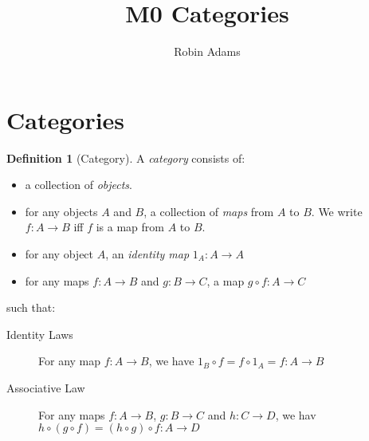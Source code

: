 \documentclass{article}
\title{M0 Categories}
\author{Robin Adams}
\theoremstyle{definition}
\newtheorem{definition}[axiom]{Definition}
\begin{document}
\maketitle
\tableofcontents

\section{Categories}

\begin{definition}[Category]
    A \emph{category} consists of:
    \begin{itemize}
        \item a collection of \emph{objects}.
        \item for any objects $A$ and $B$, a collection of \emph{maps} from $A$ to $B$. We write $f : A \rightarrow B$
        iff $f$ is a map from $A$ to $B$.
        \item for any object $A$, an \emph{identity map} $1_A : A \rightarrow A$
        \item for any maps $f : A \rightarrow B$ and $g : B \rightarrow C$, a map $g \circ f : A \rightarrow C$
    \end{itemize}
    such that:
    \begin{description}
        \item[Identity Laws]
        For any map $f : A \rightarrow B$, we have $1_B \circ f = f \circ 1_A = f : A \rightarrow B$
        \item[Associative Law]
        For any maps $f : A \rightarrow B$, $g : B \rightarrow C$ and $h : C \rightarrow D$, we hav
        $h \circ (g \circ f) = (h \circ g) \circ f : A \rightarrow D$ 
    \end{description}
\end{definition}
\end{document}
